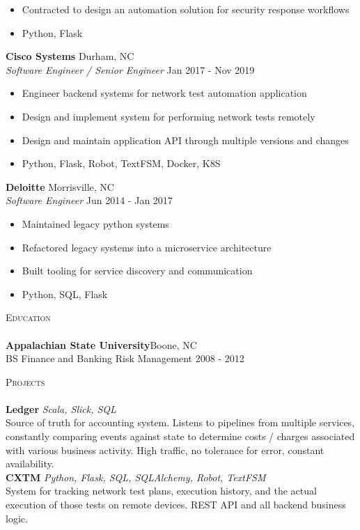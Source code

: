 \documentclass[a4paper]{article}
\newcommand{\lineunder} {
    \vspace*{-8pt} \\
    \hspace*{-18pt} \hrulefill \\
}
\newcommand{\header} [1] {
    {\hspace*{-18pt}\vspace*{6pt} \textsc{#1}}
    \vspace*{-6pt} \lineunder
}
\begin{document}
\vspace{-1mm}
\begin{itemize} \itemsep 1pt
	\item Contracted to design an automation solution for security response workflows
	\item Python, Flask
\end{itemize}
\textbf{Cisco Systems} \hfill Durham, NC\\
\textit{Software Engineer / Senior Engineer} \hfill Jan 2017 - Nov 2019\\
\vspace{-1mm}
\begin{itemize} \itemsep 1pt
	\item Engineer backend systems for network test automation application
	\item Design and implement system for performing network tests remotely
	\item Design and maintain application API through multiple versions and changes
	\item Python, Flask, Robot, TextFSM, Docker, K8S
\end{itemize}
\textbf{Deloitte} \hfill Morrisville, NC\\
\textit{Software Engineer} \hfill Jun 2014 - Jan 2017\\
\vspace{-1mm}
\begin{itemize} \itemsep 1pt
	\item Maintained legacy python systems
	\item Refactored legacy systems into a microservice architecture
	\item Built tooling for service discovery and communication
	\item Python, SQL, Flask
\end{itemize}

\header{Education}
\textbf{Appalachian State University}\hfill Boone, NC\\
BS Finance and Banking \textbar{} Risk Management \hfill 2008 - 2012\\
\vspace{2mm}



\header{Projects}
{\textbf{Ledger}} {\sl Scala, Slick, SQL} \\
Source of truth for accounting system. Listens to pipelines from multiple services, constantly comparing events against state to determine costs / charges associated with various business activity. High traffic, no tolerance for error, constant availability.\\
\vspace*{2mm}
{\textbf{CXTM}} {\sl Python, Flask, SQL, SQLAlchemy, Robot, TextFSM} \\
System for tracking network test plans, execution history, and the actual execution of those tests on remote devices. REST API and all backend business logic.\\
\vspace*{2mm}



\ 
\end{document}
